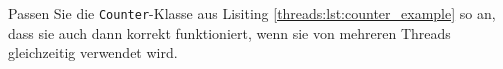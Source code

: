 \label{nebelaufigkeit03}
Passen Sie die \lstinline$Counter$-Klasse aus Lisiting \ref{threads:lst:counter_example} so an, 
dass sie auch dann korrekt funktioniert, wenn sie von mehreren Threads gleichzeitig verwendet wird.